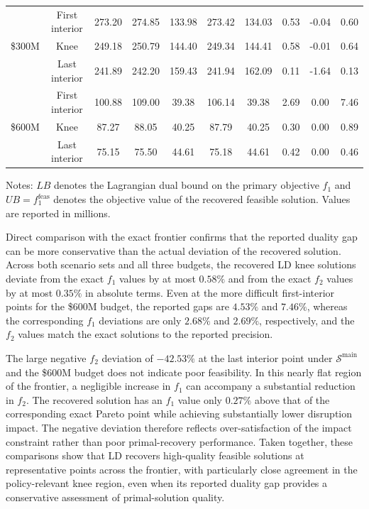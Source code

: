 \documentclass[preprint,11pt,authoryear]{elsarticle}
\begin{document}
\begin{table}[!t]
\begin{tabular}{lccccccccc}
\midrule
\multirow{3}{*}{\$300M}
& First interior & 273.20 & 274.85 & 133.98 & 273.42 & 134.03 & 0.53 & -0.04 & 0.60 \\
& Knee           & 249.18 & 250.79 & 144.40 & 249.34 & 144.41 & 0.58 & -0.01 & 0.64 \\
& Last interior  & 241.89 & 242.20 & 159.43 & 241.94 & 162.09 & 0.11 & -1.64 & 0.13 \\

\midrule
\multirow{3}{*}{\$600M}
& First interior & 100.88 & 109.00 & 39.38 & 106.14 & 39.38 & 2.69 & 0.00 & 7.46 \\
& Knee           & 87.27  & 88.05  & 40.25 & 87.79  & 40.25 & 0.30 & 0.00 & 0.89 \\
& Last interior  & 75.15  & 75.50  & 44.61 & 75.18  & 44.61 & 0.42 & 0.00 & 0.46 \\

\bottomrule
\end{tabular}

\vspace{2mm}
\begin{minipage}{\textwidth}
\footnotesize
Notes: $LB$ denotes the Lagrangian dual bound on the primary objective $f_1$ and
$UB=f_1^{\text{feas}}$ denotes the objective value of the recovered feasible solution.
Values are reported in millions.
\end{minipage}
\end{table}

Direct comparison with the exact frontier confirms that the reported duality
gap can be more conservative than the actual deviation of the recovered
solution. Across both scenario sets and all three budgets, the recovered LD
knee solutions deviate from the exact $f_1$ values by at most $0.58\%$ and
from the exact $f_2$ values by at most $0.35\%$ in absolute terms. Even at the
more difficult first-interior points for the \$600M budget, the reported gaps
are $4.53\%$ and $7.46\%$, whereas the corresponding $f_1$ deviations are only
$2.68\%$ and $2.69\%$, respectively, and the $f_2$ values match the exact
solutions to the reported precision.

The large negative $f_2$ deviation of $-42.53\%$ at the last interior point
under $\mathcal{S}^{\text{main}}$ and the \$600M budget does not indicate poor
feasibility. In this nearly flat region of the frontier, a negligible increase
in $f_1$ can accompany a substantial reduction in $f_2$. The recovered
solution has an $f_1$ value only $0.27\%$ above that of the corresponding exact
Pareto point while achieving substantially lower disruption impact. The
negative deviation therefore reflects over-satisfaction of the impact
constraint rather than poor primal-recovery performance. Taken together, these comparisons show that LD recovers high-quality feasible
solutions at representative points across the frontier, with particularly
close agreement in the policy-relevant knee region, even when its reported
duality gap provides a conservative assessment of primal-solution quality.
\end{document}
